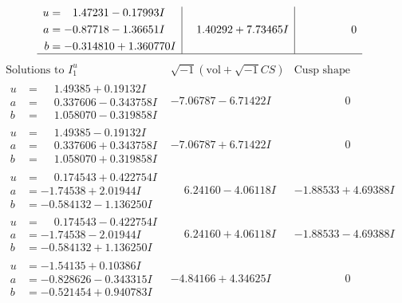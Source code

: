 \documentclass[1p]{elsarticle_modified}
\theoremstyle{definition}
\newcommand{\I}{\sqrt{-1}}
\begin{document}
$$\begin{array}{c|c|c}
\begin{aligned}
u &= \phantom{-}1.47231 - 0.17993 I \\
a &= -0.87718 - 1.36651 I \\
b &= -0.314810 + 1.360770 I\end{aligned}
 & \phantom{-}1.40292 + 7.73465 I & \phantom{-0.000000 } 0\\
 \hline 
 \end{array}$$\newpage$$\begin{array}{c|c|c}  
\text{Solutions to }I^u_{1}& \I (\text{vol} + \sqrt{-1}CS) & \text{Cusp shape}\\
 \hline 
\begin{aligned}
u &= \phantom{-}1.49385 + 0.19132 I \\
a &= \phantom{-}0.337606 - 0.343758 I \\
b &= \phantom{-}1.058070 - 0.319858 I\end{aligned}
 & -7.06787 - 6.71422 I & \phantom{-0.000000 } 0 \\ \hline\begin{aligned}
u &= \phantom{-}1.49385 - 0.19132 I \\
a &= \phantom{-}0.337606 + 0.343758 I \\
b &= \phantom{-}1.058070 + 0.319858 I\end{aligned}
 & -7.06787 + 6.71422 I & \phantom{-0.000000 } 0 \\ \hline\begin{aligned}
u &= \phantom{-}0.174543 + 0.422754 I \\
a &= -1.74538 + 2.01944 I \\
b &= -0.584132 - 1.136250 I\end{aligned}
 & \phantom{-}6.24160 - 4.06118 I & -1.88533 + 4.69388 I \\ \hline\begin{aligned}
u &= \phantom{-}0.174543 - 0.422754 I \\
a &= -1.74538 - 2.01944 I \\
b &= -0.584132 + 1.136250 I\end{aligned}
 & \phantom{-}6.24160 + 4.06118 I & -1.88533 - 4.69388 I \\ \hline\begin{aligned}
u &= -1.54135 + 0.10386 I \\
a &= -0.828626 - 0.343315 I \\
b &= -0.521454 + 0.940783 I\end{aligned}
 & -4.84166 + 4.34625 I & \phantom{-0.000000 } 0 \\ \hline\begin{aligned}

\end{aligned}
\end{array}$$
\end{document}
